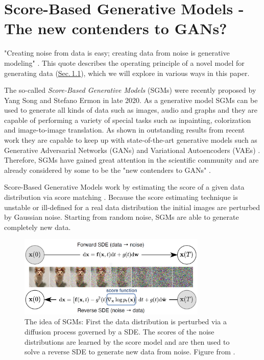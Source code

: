 \section{Score-Based Generative Models - The new contenders to GANs?} 
\thispagestyle{plain}
"Creating noise from data is easy; creating data from noise is generative modeling" \cite{score_3}. This quote describes the operating principle of a novel model for generating data (\hyperref[sec:1.1]{Sec.\,1.1}), which we will explore in various ways in this paper.

The so-called \textit{Score-Based Generative Models} (SGMs) were recently proposed by Yang Song and Stefano Ermon \cite{score_1} in late 2020. As a generative model SGMs can be used to generate all kinds of data such as images, audio and graphs and they are capable of performing a variety of special tasks such as inpainting, colorization and image-to-image translation. As shown in outstanding results from recent work \cite{score_3} they are capable to keep up with state-of-the-art generative models such as Generative Adversarial Networks (GANs) \cite{gan_original} and Variational Autoencoders (VAEs) \cite{vae_original}. Therefore, SGMs have gained great attention in the scientific community and are already considered by some to be the "new contenders to GANs" \cite{blog}.

\thispagestyle{plain}
Score-Based Generative Models work by estimating the score of a given data distribution via score matching \cite{score_matching_original}. Because the score estimating technique is unstable or ill-defined for a real data distribution the initial images are perturbed by Gaussian noise. Starting from random noise, SGMs are able to generate completely new data.

\thispagestyle{plain}
%
\begin{figure}[]
    \centering
    \includegraphics[width=0.8\textwidth]{Chapters/figures/sgm.PNG}
    \caption[The idea of Score-Based Generative Models]{The idea of SGMs: First the data distribution is perturbed via a diffusion process governed by a SDE. The scores of the noise distributions are learned by the score model and are then used to solve a reverse SDE to generate new data from noise. Figure from \cite{score_3}.}
\end{figure}
%

